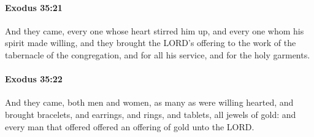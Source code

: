 		\paragraph{Exodus 35:21} %
			\label{EXODUS-35-21}

			And they came, every one whose heart stirred him up, and every one whom his spirit made willing, and they brought the LORD's offering to the work of the tabernacle of the congregation, and for all his service, and for the holy garments.


		\paragraph{Exodus 35:22} %
			\label{EXODUS-35-22}

			And they came, both men and women, as many as were willing hearted, and brought bracelets, and earrings, and rings, and tablets, all jewels of gold: and every man that offered offered an offering of gold unto the LORD.

